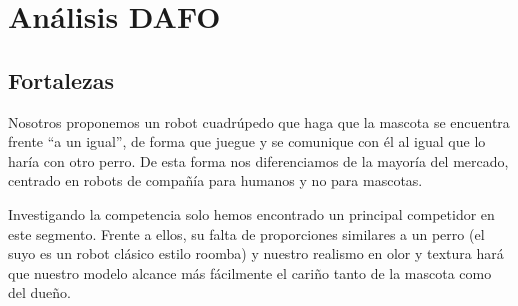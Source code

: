 \section{Análisis DAFO}  

\begin{figure}[H]
    \centering
\end{figure}

\subsection{Fortalezas}

Nosotros proponemos un robot cuadrúpedo que haga que la mascota se encuentra frente ``a un igual'', de forma que juegue y se comunique con él al igual que lo haría con otro perro. De esta forma nos diferenciamos de la mayoría del mercado, centrado en robots de compañía para humanos y no para mascotas. 

Investigando la competencia solo hemos encontrado un principal competidor en este segmento. Frente a ellos, su falta de proporciones similares a un perro (el suyo es un robot clásico estilo roomba) y nuestro realismo en olor y textura hará que nuestro modelo alcance más fácilmente el cariño tanto de la mascota como del dueño.

